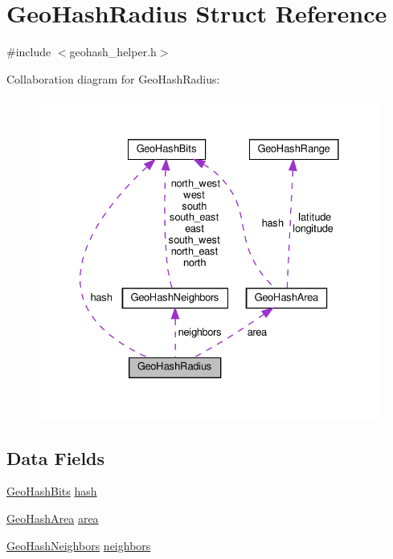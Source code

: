 \hypertarget{struct_geo_hash_radius}{}\section{Geo\+Hash\+Radius Struct Reference}
\label{struct_geo_hash_radius}


{\ttfamily \#include $<$geohash\+\_\+helper.\+h$>$}



Collaboration diagram for Geo\+Hash\+Radius\+:
\nopagebreak
\begin{figure}[H]
\begin{center}
\leavevmode
\includegraphics[width=330pt]{struct_geo_hash_radius__coll__graph}
\end{center}
\end{figure}
\subsection*{Data Fields}
\begin{DoxyCompactItemize}
\item 
\hyperlink{struct_geo_hash_bits}{Geo\+Hash\+Bits} \hyperlink{struct_geo_hash_radius_aaa5dc202256f654179069f62d2d44cf6}{hash}
\item 
\hyperlink{struct_geo_hash_area}{Geo\+Hash\+Area} \hyperlink{struct_geo_hash_radius_ab8ed53e3d15a3c96c0b699110d1b3d69}{area}
\item 
\hyperlink{struct_geo_hash_neighbors}{Geo\+Hash\+Neighbors} \hyperlink{struct_geo_hash_radius_a2294fb3cd98344a75f1e5960818f2a31}{neighbors}
\end{DoxyCompactItemize}


